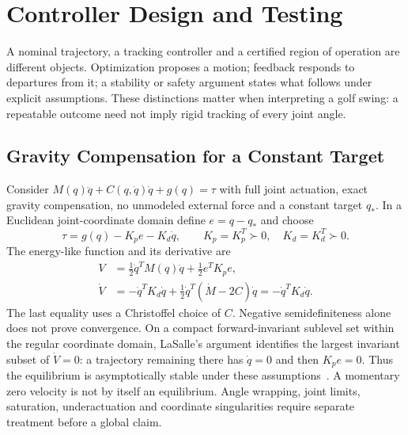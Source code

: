 \chapter{Controller Design and Testing}
\label{ch:controller-design}

A nominal trajectory, a tracking controller and a certified region of operation
are different objects. Optimization proposes a motion; feedback responds to
departures from it; a stability or safety argument states what follows under
explicit assumptions. These distinctions matter when interpreting a golf swing:
a repeatable outcome need not imply rigid tracking of every joint angle.

\section{Gravity Compensation for a Constant Target}

Consider $M(q)\ddot q+C(q,\dot q)\dot q+g(q)=\tau$ with full joint actuation,
exact gravity compensation, no unmodeled external force and a constant target
$q_*$. In a Euclidean joint-coordinate domain define $e=q-q_*$ and choose
\[
 \tau=g(q)-K_pe-K_d\dot q,\qquad K_p=K_p^T\succ0,\quad K_d=K_d^T\succ0.
\]
The energy-like function and its derivative are
\begin{align*}
 V&=\tfrac12\dot q^TM(q)\dot q+\tfrac12e^TK_pe,\\
 \dot V&=-\dot q^TK_d\dot q+
 \tfrac12\dot q^T(\dot M-2C)\dot q=-\dot q^TK_d\dot q.
\end{align*}
The last equality uses a Christoffel choice of $C$. Negative semidefiniteness
alone does not prove convergence. On a compact forward-invariant sublevel set
within the regular coordinate domain, LaSalle's argument identifies the largest
invariant subset of $\dot V=0$: a trajectory remaining there has $\dot q=0$ and
then $K_pe=0$. Thus the equilibrium is asymptotically stable under these
assumptions~\cite{SlotineLi1991}. A momentary zero velocity is not by itself an
equilibrium. Angle wrapping, joint limits, saturation, underactuation and
coordinate singularities require separate treatment before a global claim.

